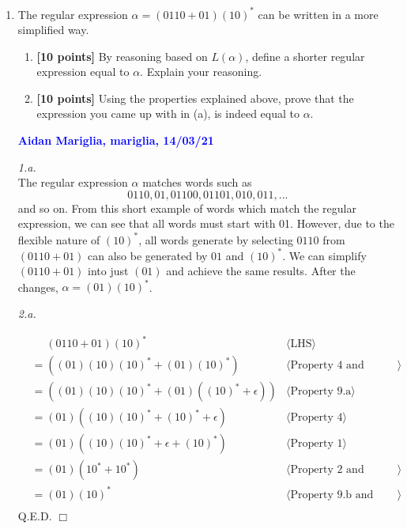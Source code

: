 \documentclass[11pt,fleqn]{article}
\newcommand{\be}{\begin{enumerate}}
\newcommand{\ee}{\end{enumerate}}
\newcommand{\sglsp}{\ }
\newenvironment{proof}{\par\noindent{\bf Proof\sglsp}}{\hfill$\Box$}
\newcommand{\pnote}[1]{{\langle \text{#1} \rangle}}
\begin{document}
	\be
	
	\item The regular expression $\alpha = (0110 + 01) (10)^*$ can be written in a more simplified way. 
	\be
	\item \textbf{[10 points]} By reasoning based on $L(\alpha)$, define a shorter regular expression equal to $\alpha$. Explain your reasoning.
	\item \textbf{[10 points]} Using the properties explained above, prove that the expression you came up with in (a), is indeed equal to $\alpha$.
	\ee
	
	\bigskip
	
	\textcolor{blue}{\textbf{Aidan Mariglia, mariglia, 14/03/21}}

        \medskip

        \noindent
        

		\emph{1.a.}\\
		The regular expression $\alpha$ matches words such as
		\[ 0110, 01, 01100, 01101, 010, 011, ... \] and so on.
		From this short example of words which match the regular
		expression, we can see that all words must start with 01.
		However, due to the flexible nature of $(10)^*$, all words
		generate by selecting $0110$ from $(0110 + 01)$ can also
		be generated by $01$ and $(10)^*$.
		We can simplify $(0110 + 01)$ into just
		$(01)$ and achieve the same results. After the changes, 
		$\alpha = (01)(10)^*$.
		
		\emph{2.a.}

		\begin{proof}
			\begin{align*}
			  &\phantom{{}=} (0110 + 01)(10)^* &\pnote{LHS}\\
			  &= ((01)(10)(10)^* + (01)(10)^*) &\pnote{Property 4 and Property 3}\\
			  &= ((01)(10)(10)^* + (01)((10)^* + \epsilon)) & \pnote{Property 9.a}\\
			  &= (01)((10)(10)^* + (10)^* + \epsilon) & \pnote{Property 4}\\
			  &= (01)((10)(10)^* + \epsilon + (10)^*) &\pnote{Property 1}\\
			  &= (01)(10^* + 10^*) &\pnote{Property 2 and Property 9.d}\\
			  &= (01)(10)^* &\pnote{Property 9.b and RHS}\\
			\end{align*}
			Q.E.D.
		\end{proof}
\ee
\end{document}
